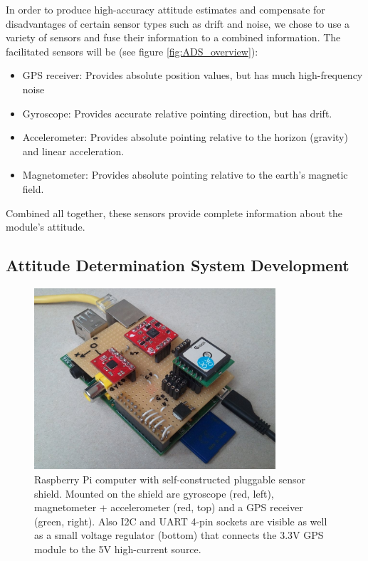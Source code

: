 \noindent
In order to produce high-accuracy attitude estimates and compensate for disadvantages of certain sensor types such as drift and noise, we chose to use a variety of sensors and fuse their information to a combined information.
The facilitated sensors will be (see figure \ref{fig:ADS_overview}):
\begin{itemize}
\item GPS receiver: Provides absolute position values, but has much high-frequency noise
\item Gyroscope: Provides accurate relative pointing direction, but has drift.
\item Accelerometer: Provides absolute pointing relative to the horizon (gravity) and linear acceleration.
\item Magnetometer: Provides absolute pointing relative to the earth's magnetic field.
\end{itemize}

\noindent
Combined all together, these sensors provide complete information about the module's attitude.

\subsection{Attitude Determination System Development}
\FloatBarrier

\begin{figure}
\centering
\includegraphics[width=0.8\textwidth]{figures/raspberry-sensors-top.jpg}
\caption[Raspberry Pi computer with self-constructed pluggable sensor shield]{Raspberry Pi computer with self-constructed pluggable sensor shield.
Mounted on the shield are gyroscope (red, left), magnetometer + accelerometer (red, top) and a GPS receiver (green, right).
Also I2C and UART 4-pin sockets are visible as well as a small voltage regulator (bottom) that connects the 3.3V GPS module to the 5V high-current source.}
\label{fig:raspberry-sensors-top}
\end{figure}

